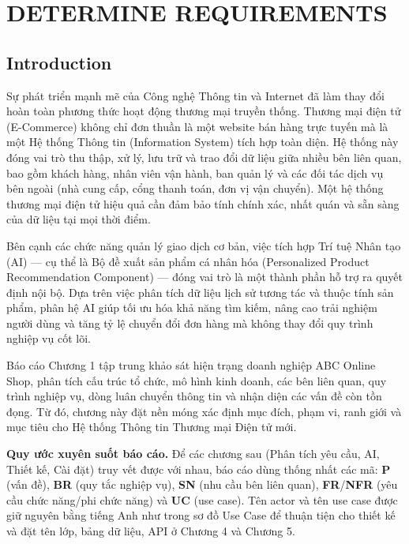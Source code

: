 \documentclass[12pt,a4paper,oneside]{report}
\newif\ifmark \marktrue
\newenvironment{chgblock}{\ifmark\color{red}\fi}{}
\begin{document}
\setcounter{page}{1}


\chapter{DETERMINE REQUIREMENTS}

\section{Introduction}

Sự phát triển mạnh mẽ của Công nghệ Thông tin và Internet đã làm thay đổi hoàn toàn phương thức hoạt động thương mại truyền thống. Thương mại điện tử (E-Commerce) không chỉ đơn thuần là một website bán hàng trực tuyến mà là một Hệ thống Thông tin (Information System) tích hợp toàn diện. Hệ thống này đóng vai trò thu thập, xử lý, lưu trữ và trao đổi dữ liệu giữa nhiều bên liên quan, bao gồm khách hàng, nhân viên vận hành, ban quản lý và các đối tác dịch vụ bên ngoài (nhà cung cấp, cổng thanh toán, đơn vị vận chuyển). Một hệ thống thương mại điện tử hiệu quả cần đảm bảo tính chính xác, nhất quán và sẵn sàng của dữ liệu tại mọi thời điểm.

Bên cạnh các chức năng quản lý giao dịch cơ bản, việc tích hợp Trí tuệ Nhân tạo (AI) --- cụ thể là Bộ đề xuất sản phẩm cá nhân hóa (Personalized Product Recommendation Component) --- đóng vai trò là một thành phần hỗ trợ ra quyết định nội bộ. Dựa trên việc phân tích dữ liệu lịch sử tương tác và thuộc tính sản phẩm, phân hệ AI giúp tối ưu hóa khả năng tìm kiếm, nâng cao trải nghiệm người dùng và tăng tỷ lệ chuyển đổi đơn hàng mà không thay đổi quy trình nghiệp vụ cốt lõi.

Báo cáo Chương 1 tập trung khảo sát hiện trạng doanh nghiệp ABC Online Shop, phân tích cấu trúc tổ chức, mô hình kinh doanh, các bên liên quan, quy trình nghiệp vụ, dòng luân chuyển thông tin và nhận diện các vấn đề còn tồn đọng. Từ đó, chương này đặt nền móng xác định mục đích, phạm vi, ranh giới và mục tiêu cho Hệ thống Thông tin Thương mại Điện tử mới.

\begin{chgblock}
\textbf{Quy ước xuyên suốt báo cáo.} Để các chương sau (Phân tích yêu cầu, AI, Thiết kế, Cài đặt) truy vết được với nhau, báo cáo dùng thống nhất các mã: \textbf{P} (vấn đề), \textbf{BR} (quy tắc nghiệp vụ), \textbf{SN} (nhu cầu bên liên quan), \textbf{FR}/\textbf{NFR} (yêu cầu chức năng/phi chức năng) và \textbf{UC} (use case). Tên actor và tên use case được giữ nguyên bằng tiếng Anh như trong sơ đồ Use Case để thuận tiện cho thiết kế và đặt tên lớp, bảng dữ liệu, API ở Chương 4 và Chương 5.
\end{chgblock}
\end{document}
